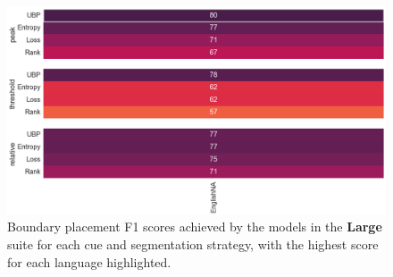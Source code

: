 \begin{figure}
    \centering
    \includegraphics[width=0.99\linewidth]{Figures/15Phonology/large.png}
    \caption{Boundary placement F1 scores achieved by the models in the \textbf{Large} suite for each cue and segmentation strategy, with the highest score for each language highlighted.}
    \label{fig:15-large}
\end{figure}


